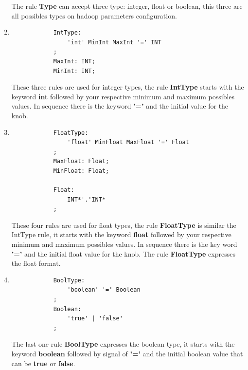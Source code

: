 \begin{enumerate}
		The rule \textbf{Type} can accept three type: integer, float or boolean,
		this three are all possibles types on hadoop parameters configuration.

	\item
		\singlespacing
		\begin{listing}[H]
		\begin{verbatim}
			IntType:
				'int' MinInt MaxInt '=' INT
			;
			MaxInt: INT;
			MinInt: INT;
		\end{verbatim}
		\label{listing:modelRule}
		\end{listing}

		These three rules are used for integer types, the rule \textbf{IntType}
		starts with the keyword {\bf int} followed by your respective minimum
		and maximum possibles values. In sequence there is the keyword {\bf '='}
		and the initial value for the knob.

	\item
		\singlespacing
		\begin{listing}[H]
		\begin{verbatim}
			FloatType:
				'float' MinFloat MaxFloat '=' Float
			;
			MaxFloat: Float;
			MinFloat: Float;

			Float:
				INT*'.'INT*
			;
		\end{verbatim}
		\label{listing:modelRule}
		\end{listing}

		These four rules are used for float types, the rule \textbf{FloatType} is
		similar the IntType rule, it starts with the keyword {\bf float} followed
		by your respective minimum and maximum possibles values. In sequence there
		is the key word {\bf '='}	and the initial float value for the knob. The rule
		{\bf FloatType} expresses the float format.

	\item
		\singlespacing
		\begin{listing}[H]
		\begin{verbatim}
			BoolType:
				'boolean' '=' Boolean
			;
			Boolean:
				'true' | 'false' 
			;
		\end{verbatim}
		\label{listing:modelRule}
		\end{listing}

		The last one rule {\bf BoolType} expresses the boolean type, it starts with
		the keyword {\bf boolean} followed by signal of \textbf{'='} and the initial
		boolean	value that can be {\bf true} or {\bf false}.

\end{enumerate}
